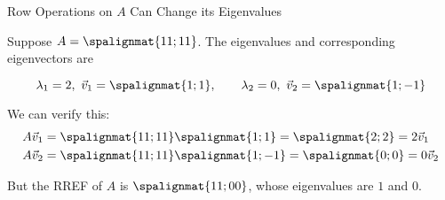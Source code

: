 \begin{frame}{Row Operations on $A$ Can Change its Eigenvalues} 

    Suppose $A = \spalignmat{1 1;1 1}$. The eigenvalues and corresponding eigenvectors are 
    
    $$\lambda_1 = 2, \ \vec v_1 = \spalignmat{1;1}, \qquad \lambda_2 = 0, \ \vec v_2 = \spalignmat{1;-1} $$
    
    We can verify this:
    \pause 
            \begin{align*}
            & A \vec v_1
            = \spalignmat{1 1;1 1} 
            \spalignmat{1;1} =  \spalignmat{2;2} = 2 \vec v_1\\
            & A \vec v_2
            = \spalignmat{1 1;1 1} 
            \spalignmat{1;-1} =  \spalignmat{0;0} = 0\vec v_2
            \end{align*}

    \pause
    
    But the RREF of $A$ is $\spalignmat{1 1;0 0}$, whose eigenvalues are $1$ and $0$. 

\end{frame}









